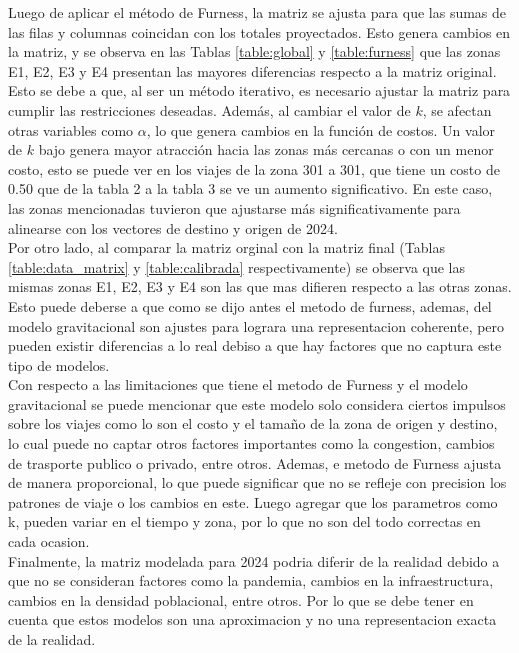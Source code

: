 \documentclass[letterpaper,12pt]{article}
\begin{document}
Luego de aplicar el método de Furness, la matriz se ajusta para que las sumas de las filas y columnas coincidan con los totales proyectados. Esto genera cambios en la matriz, y se observa en las Tablas \ref{table:global} y \ref{table:furness} que las zonas E1, E2, E3 y E4 presentan las mayores diferencias respecto a la matriz original. Esto se debe a que, al ser un método iterativo, es necesario ajustar la matriz para cumplir las restricciones deseadas. Además, al cambiar el valor de $k$, se afectan otras variables como $\alpha$, lo que genera cambios en la función de costos. Un valor de $k$ bajo genera mayor atracción hacia las zonas más cercanas o con un menor costo, esto se puede ver en los viajes de la zona 301 a 301, que tiene un costo de 0.50 que de la tabla 2 a la tabla 3 se ve un aumento significativo. En este caso, las zonas mencionadas tuvieron que ajustarse más significativamente para alinearse con los vectores de destino y origen de 2024.\\

Por otro lado, al comparar la matriz orginal con la matriz final (Tablas \ref{table:data_matrix} y \ref{table:calibrada} respectivamente) se observa que las mismas zonas E1, E2, E3 y E4 son las que mas difieren respecto a las otras zonas. Esto puede deberse a que como se dijo antes el metodo de furness, ademas, del modelo gravitacional son ajustes para lograra una representacion coherente, pero pueden existir diferencias a lo real debiso a que hay factores que no captura este tipo de modelos.\\

Con respecto a las limitaciones que tiene el metodo de Furness y el modelo gravitacional se puede mencionar que este modelo solo considera ciertos impulsos sobre los viajes como lo son el costo y el tamaño de la zona de origen y destino, lo cual puede no captar otros factores importantes como la congestion, cambios de trasporte publico o privado, entre otros. Ademas, e metodo de Furness ajusta de manera proporcional, lo que puede significar que no se refleje con precision los patrones de viaje o los cambios en este. Luego agregar que los parametros como k, pueden variar en el tiempo y zona, por lo que no son del todo correctas en cada ocasion. \\

Finalmente, la matriz modelada para 2024 podria diferir de la realidad debido a que no se consideran factores como la pandemia, cambios en la infraestructura, cambios en la densidad poblacional, entre otros. Por lo que se debe tener en cuenta que estos modelos son una aproximacion y no una representacion exacta de la realidad.
\end{document}
